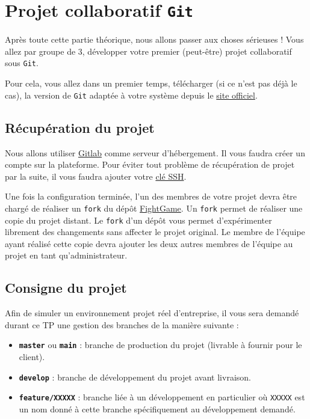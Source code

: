 \documentclass[11pt,a4paper,oneside]{article}
\begin{document}
\section{Projet collaboratif \texttt{Git}}

Après toute cette partie théorique, nous allons passer aux choses sérieuses ! Vous allez par groupe de 3, développer votre premier (peut-être) projet collaboratif sous \texttt{Git}.

\vspace{2mm}
Pour cela, vous allez dans un premier temps, télécharger (si ce n'est pas déjà le cas), la version de \texttt{Git} adaptée à votre système depuis le \href{https://git-scm.com/downloads}{site officiel}.

\subsection{Récupération du projet}

Nous allons utiliser \href{https://gitlab.com}{Gitlab} comme serveur d'hébergement. Il vous faudra créer un compte sur la plateforme. Pour éviter tout problème de récupération de projet par la suite, il vous faudra ajouter votre \href{https://gitlab.com/-/profile/keys}{clé SSH}.

\vspace{2mm}
Une fois la configuration terminée, l'un des membres de votre projet devra être chargé de réaliser un \texttt{fork} du dépôt \href{https://gitlab.com/jbuisine/fightgame}{FightGame}. Un \texttt{fork} permet de réaliser une copie du projet distant. Le \texttt{fork} d'un dépôt vous permet d'expérimenter librement des changements sans affecter le projet original. Le membre de l'équipe ayant réalisé cette copie devra ajouter les deux autres membres de l'équipe au projet en tant qu'administrateur.

\subsection{Consigne du projet}

Afin de simuler un environnement projet réel d'entreprise, il vous sera demandé durant ce TP une gestion des branches de la manière suivante :

\begin{itemize}
	\item \textbf{\texttt{master}} ou \textbf{\texttt{main}} : branche de production du projet (livrable à fournir pour le client).
	\item \textbf{\texttt{develop}} : branche de développement du projet avant livraison.
	\item \textbf{\texttt{feature/XXXXX}} : branche liée à un développement en particulier où \texttt{XXXXX} est un nom donné à cette branche spécifiquement au développement demandé.
\end{itemize}
\end{document}
